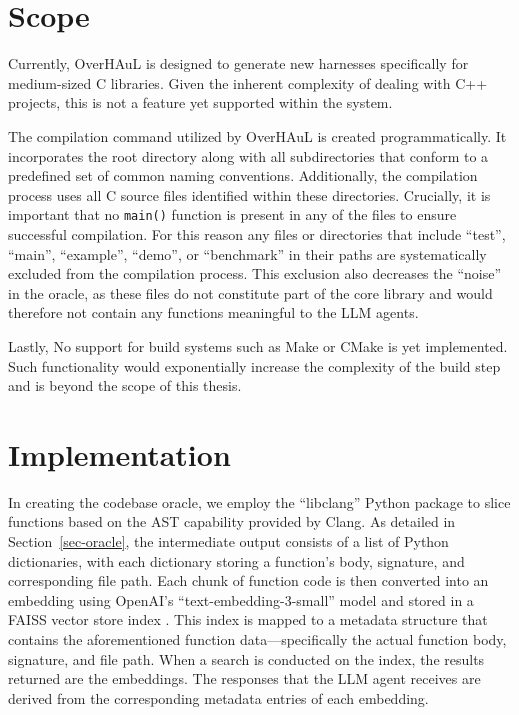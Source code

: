 \documentclass[
  a4paper,
]{scrreprt}
\theoremstyle{definition}
\theoremstyle{remark}
\begin{document}
\section{Scope}\label{sec-scope}

Currently, OverHAuL is designed to generate new harnesses specifically
for medium-sized C libraries. Given the inherent complexity of dealing
with C++ projects, this is not a feature yet supported within the
system.

The compilation command utilized by OverHAuL is created
programmatically. It incorporates the root directory along with all
subdirectories that conform to a predefined set of common naming
conventions. Additionally, the compilation process uses all C source
files identified within these directories. Crucially, it is important
that no \texttt{main()} function is present in any of the files to
ensure successful compilation. For this reason any files or directories
that include ``test'', ``main'', ``example'', ``demo'', or ``benchmark''
in their paths are systematically excluded from the compilation process.
This exclusion also decreases the ``noise'' in the oracle, as these
files do not constitute part of the core library and would therefore not
contain any functions meaningful to the LLM agents.

Lastly, No support for build systems such as Make or CMake
\autocite{cedilnik2000,feldman1979} is yet implemented. Such
functionality would exponentially increase the complexity of the build
step and is beyond the scope of this thesis.

\section{Implementation}\label{sec-implementation}

In creating the codebase oracle, we employ the ``libclang'' Python
package \autocite{he2025} to slice functions based on the AST capability
provided by Clang. As detailed in Section~\ref{sec-oracle}, the
intermediate output consists of a list of Python dictionaries, with each
dictionary storing a function's body, signature, and corresponding file
path. Each chunk of function code is then converted into an embedding
using OpenAI's ``text-embedding-3-small'' model
\autocite{openaidocs2025a} and stored in a FAISS vector store index
\autocite{faiss}. This index is mapped to a metadata structure that
contains the aforementioned function data---specifically the actual
function body, signature, and file path. When a search is conducted on
the index, the results returned are the embeddings. The responses that
the LLM agent receives are derived from the corresponding metadata
entries of each embedding.
\end{document}
